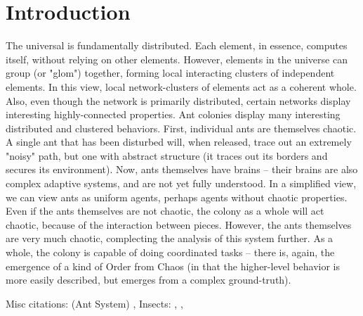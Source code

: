 \documentclass{nature}
\begin{document}
\section{Introduction}

The universal is fundamentally distributed.
Each element, in essence, computes itself, without relying on other elements\cite{lloyd2006programming}.
However, elements in the universe can group (or "glom") together, forming local interacting clusters of independent elements.
In this view, local network-clusters of elements act as a coherent whole.
Also, even though the network is primarily distributed, certain networks display interesting highly-connected properties\cite{watts_strogatz_2011}.
Ant colonies display many interesting distributed and clustered behaviors.
First, individual ants are themselves chaotic. 
A single ant that has been disturbed will, when released, trace out an extremely "noisy" path, but one with abstract structure (it traces out its borders and secures its environment).
Now, ants themselves have brains -- their brains are also complex adaptive systems, and are not yet fully understood. 
In a simplified view, we can view ants as uniform agents, perhaps agents without chaotic properties.
Even if the ants themselves are not chaotic, the colony as a whole will act chaotic, because of the interaction between pieces.
However, the ants themselves are very much chaotic, complecting the analysis of this system further.
As a whole, the colony is capable of doing coordinated tasks -- there is, again, the emergence of a kind of Order from Chaos (in that the higher-level behavior is more easily described, but emerges from a complex ground-truth). 


Misc citations: (Ant System) \cite{brabazon2017foraging}, \cite{brabazon2016distributed} \cite{1997} \cite{dorigo_maniezzo_colorni_1996}
Insects: \cite{heyman2017ants}, \cite{fonio2016locally}, \cite{gelblum2015ant}
\end{document}
